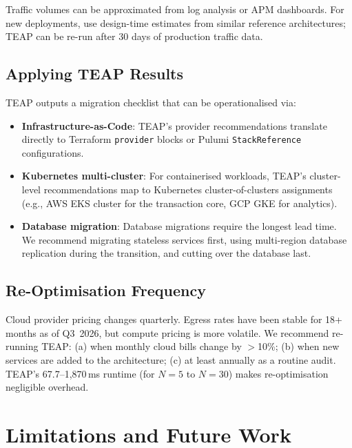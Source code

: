 \documentclass[10pt,journal]{IEEEtran}
\begin{document}
Traffic volumes can be approximated from log analysis or APM dashboards.
For new deployments, use design-time estimates from similar reference architectures;
TEAP can be re-run after 30 days of production traffic data.

\subsection{Applying TEAP Results}

TEAP outputs a migration checklist that can be operationalised via:
\begin{itemize}[leftmargin=*,noitemsep]
  \item \textbf{Infrastructure-as-Code}: TEAP's provider recommendations
    translate directly to Terraform \texttt{provider} blocks or Pulumi
    \texttt{StackReference} configurations.
  \item \textbf{Kubernetes multi-cluster}: For containerised workloads,
    TEAP's cluster-level recommendations map to Kubernetes cluster-of-clusters
    assignments (e.g., AWS EKS cluster for the transaction core,
    GCP GKE for analytics).
  \item \textbf{Database migration}: Database migrations require the longest
    lead time. We recommend migrating stateless services first, using
    multi-region database replication during the transition, and cutting
    over the database last.
\end{itemize}

\subsection{Re-Optimisation Frequency}

Cloud provider pricing changes quarterly.
Egress rates have been stable for 18+ months as of Q3~2026, but compute pricing
is more volatile.
We recommend re-running TEAP: (a) when monthly cloud bills change by $>$10\%;
(b) when new services are added to the architecture; (c) at least annually as a
routine audit.
TEAP's 67.7--1{,}870\,ms runtime (for $N=5$ to $N=30$) makes re-optimisation
negligible overhead.

\section{Limitations and Future Work}\label{sec:limits}
\end{document}
